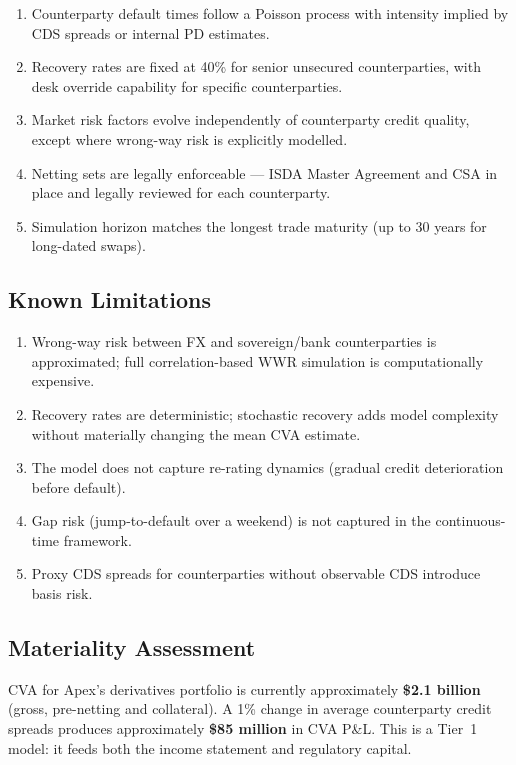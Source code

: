 \documentclass[11pt,a4paper]{article}
\begin{document}
\begin{enumerate}[noitemsep]
  \item Counterparty default times follow a Poisson process with intensity
        implied by CDS spreads or internal PD estimates.
  \item Recovery rates are fixed at 40\% for senior unsecured counterparties,
        with desk override capability for specific counterparties.
  \item Market risk factors evolve independently of counterparty credit
        quality, except where wrong-way risk is explicitly modelled.
  \item Netting sets are legally enforceable --- ISDA Master Agreement and CSA
        in place and legally reviewed for each counterparty.
  \item Simulation horizon matches the longest trade maturity (up to 30 years
        for long-dated swaps).
\end{enumerate}

\subsection{Known Limitations}

\begin{enumerate}[noitemsep]
  \item Wrong-way risk between FX and sovereign/bank counterparties is
        approximated; full correlation-based WWR simulation is computationally
        expensive.
  \item Recovery rates are deterministic; stochastic recovery adds model
        complexity without materially changing the mean CVA estimate.
  \item The model does not capture re-rating dynamics (gradual credit
        deterioration before default).
  \item Gap risk (jump-to-default over a weekend) is not captured in the
        continuous-time framework.
  \item Proxy CDS spreads for counterparties without observable CDS introduce
        basis risk.
\end{enumerate}

\subsection{Materiality Assessment}

CVA for Apex's derivatives portfolio is currently approximately
\textbf{\$2.1 billion} (gross, pre-netting and collateral). A 1\% change
in average counterparty credit spreads produces approximately
\textbf{\$85 million} in CVA P\&L. This is a Tier~1 model: it feeds both
the income statement and regulatory capital.
\end{document}
